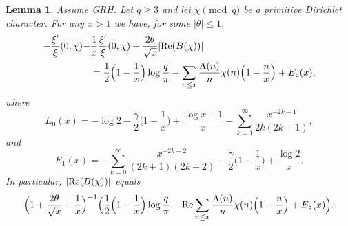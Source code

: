 \documentclass [12pt]{amsart}
\newtheorem{lemma}{Lemma}[section]
\numberwithin{equation}{section}
\begin{document}
\begin{lemma}
\label{lem3}  Assume GRH.  
Let $q\ge 3$ and let $\chi \pmod q$ be a primitive Dirichlet character. 
For any $x>1 $ we have, for some $|\theta|\le 1$,
\begin{align*}
 -\frac{\xi '}{\xi}(0, \bar{\chi}) -& \frac{1}{x} \frac{\xi '}{\xi}(0,\chi) + \frac{2\theta}{\sqrt{x}} |\textup{Re}(B(\chi))| 
\\
&=  \frac 12\Big(1-\frac 1x\Big)\log \frac q{\pi} - \sum_{n\le x}\frac{\Lambda(n)}{n}\chi(n)
\Big(1-\frac nx\Big) + E_{\frak a}(x),
\end{align*}
where
$$
E_0(x)=-\log 2 -\frac{\gamma}{2}\Big(1-\frac 1x\Big)+ \frac{\log x+1}{x}-
\sum_{k=1}^{\infty} \frac{x^{-2k-1}}{2k(2k+1)} ,
$$
and
$$
E_1(x) = -\sum_{k=0}^{\infty} \frac{x^{-2k-2}}{(2k+1)(2k+2)} -\frac{\gamma}{2}\Big(1-\frac 1x\Big) + \frac{\log 2}{x}.
$$
In particular, $|\textup{Re}(B(\chi))|$ equals 
\begin{align*}
  \Big(1+\frac{2\theta}{\sqrt{x}}+\frac{1}{x}\Big)^{-1}
\Big(\frac 12\Big(1-\frac 1x\Big)\log \frac q{\pi} - \textup{Re}\sum_{n\le x}\frac{\Lambda(n)}{n}\chi(n)
\Big(1-\frac nx\Big) + E_{\frak a}(x)\Big).
\end{align*}
\end{lemma}
\end{document}
